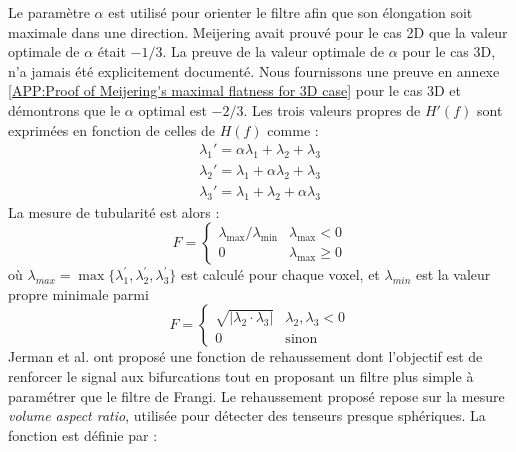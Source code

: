 Le paramètre $\alpha$ est utilisé pour orienter le filtre afin que son élongation soit maximale dans une direction. Meijering avait prouvé pour le cas 2D que la valeur optimale de $\alpha$ était $-1/3$. La preuve de la valeur optimale de $\alpha$ pour le cas 3D, n'a jamais été explicitement documenté. Nous fournissons une preuve en annexe \ref{APP:Proof of Meijering's maximal flatness for 3D case} pour le cas 3D et démontrons que le $\alpha$ optimal est $-2/3$. Les trois valeurs propres de $H'(f)$ sont exprimées en fonction de celles de $H(f)$ comme :
\begin{equation}
  \begin{aligned}
    \nonumber \lambda_1' = \alpha\lambda_1 + \lambda_2 + \lambda_3 \\
    \nonumber \lambda_2' = \lambda_1 + \alpha\lambda_2 + \lambda_3 \\
    \nonumber \lambda_3' = \lambda_1 + \lambda_2 + \alpha\lambda_3
  \end{aligned}
\end{equation}
La mesure de tubularité est alors :
\begin{equation}
\nonumber 
  F =
  \left\{
  \begin{array}{lr}
    \lambda_{\max} / \lambda_{\min}   &  \lambda_{\max} < 0\\
      0 &  \lambda_{\max} \geqslant 0
  \end{array}
  \right.
\end{equation}
où $\lambda_{max} = \max\{\lambda_{1}^{'},\lambda_{2}^{'},\lambda_{3}^{'}\}$ est calculé pour chaque voxel, et $\lambda_{min}$ est la valeur propre minimale parmi 
\begin{equation}
\nonumber
    F =
    \left\{
    \begin{array}{lr}
    
    \sqrt{|\lambda_2 \cdot \lambda_3|}   & \lambda_2, \lambda_3 < 0 \\
    0     & \textrm{sinon}
    \end{array}
    \right.
\end{equation}
Jerman et al. ont proposé une fonction de rehaussement dont l'objectif est de renforcer le signal aux bifurcations tout en proposant un filtre plus simple à paramétrer que le filtre de Frangi. Le rehaussement proposé repose sur la mesure \textit{volume aspect ratio}, utilisée pour détecter des tenseurs presque sphériques. La fonction est définie par :
